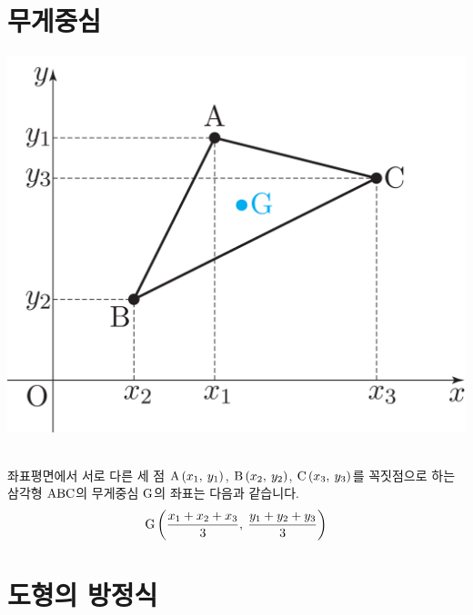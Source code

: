 \section{무게중심}
\begin{center}
\includegraphics[scale=0.125]{pic0/pic146.pdf}\
\end{center}좌표평면에서 서로 다른 세 점 $\xy[A]{x_1}{y_1}$,  $\xy[B]{x_2}{y_2}$,  $\xy[C]{x_3}{y_3}$를 꼭짓점으로 하는 삼각형 $\mrm{ABC}$의 무게중심 $\mrm{G}$의 좌표는 다음과 같습니다. \begin{align*}\xy[G]{\dfrac{x_1 + x_2 + x_3}{3}}{\dfrac{y_1 + y_2 + y_3}{3}}\end{align*}
\clearpage
\section{도형의 방정식}
